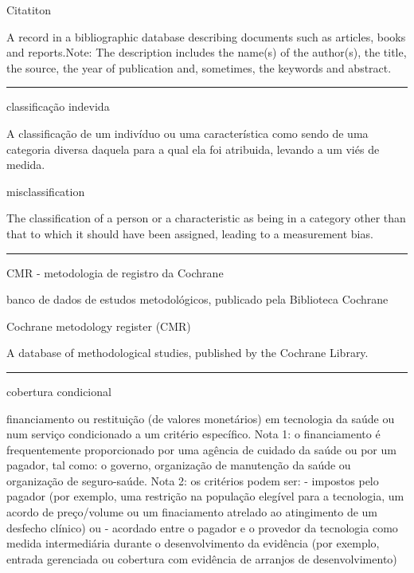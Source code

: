 \documentclass[
  openany]{book}
\begin{document}
Citatiton

A record in a bibliographic database describing documents such as articles, books and reports.Note: The description includes the name(s) of the author(s), the title, the source, the year of publication and, sometimes, the keywords and abstract.

\begin{center}\rule{0.5\linewidth}{0.5pt}\end{center}

classificação indevida

A classificação de um indivíduo ou uma característica como sendo de uma categoria diversa daquela para a qual ela foi atribuida, levando a um viés de medida.

misclassification

The classification of a person or a characteristic as being in a category other than that to which it should have been assigned, leading to a measurement bias.

\begin{center}\rule{0.5\linewidth}{0.5pt}\end{center}

CMR - metodologia de registro da Cochrane

banco de dados de estudos metodológicos, publicado pela Biblioteca Cochrane

Cochrane metodology register (CMR)

A database of methodological studies, published by the Cochrane Library.

\begin{center}\rule{0.5\linewidth}{0.5pt}\end{center}

cobertura condicional

financiamento ou restituição (de valores monetários) em tecnologia da saúde ou num serviço condicionado a um critério específico. Nota 1: o financiamento é frequentemente proporcionado por uma agência de cuidado da saúde ou por um pagador, tal como: o governo, organização de manutenção da saúde ou organização de seguro-saúde. Nota 2: os critérios podem ser: - impostos pelo pagador (por exemplo, uma restrição na população elegível para a tecnologia, um acordo de preço/volume ou um finaciamento atrelado ao atingimento de um desfecho clínico) ou - acordado entre o pagador e o provedor da tecnologia como medida intermediária durante o desenvolvimento da evidência (por exemplo, entrada gerenciada ou cobertura com evidência de arranjos de desenvolvimento)
\end{document}
